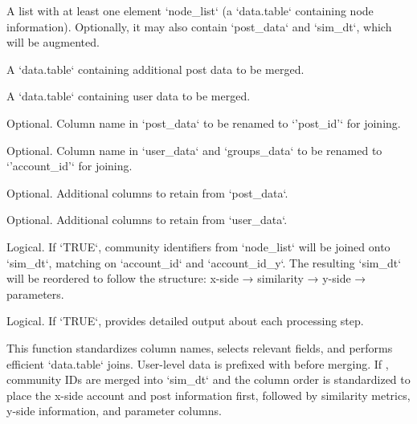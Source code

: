 \documentclass[a4paper]{book}
\begin{document}
%
\begin{Arguments}
\begin{ldescription}
\item[\code{groups\_data}] A list with at least one element `node\_list` (a `data.table` containing node information).
Optionally, it may also contain `post\_data` and `sim\_dt`, which will be augmented.

\item[\code{post\_data}] A `data.table` containing additional post data to be merged.

\item[\code{user\_data}] A `data.table` containing user data to be merged.

\item[\code{post\_id}] Optional. Column name in `post\_data` to be renamed to `'post\_id'` for joining.

\item[\code{account\_id}] Optional. Column name in `user\_data` and `groups\_data` to be renamed to `'account\_id'` for joining.

\item[\code{other\_post\_vars}] Optional. Additional columns to retain from `post\_data`.

\item[\code{other\_user\_vars}] Optional. Additional columns to retain from `user\_data`.

\item[\code{sim\_dt\_community}] Logical. If `TRUE`, community identifiers from `node\_list` will be joined onto `sim\_dt`,
matching on `account\_id` and `account\_id\_y`. The resulting `sim\_dt` will be reordered
to follow the structure: x-side → similarity → y-side → parameters.

\item[\code{verbose}] Logical. If `TRUE`, provides detailed output about each processing step.
\end{ldescription}
\end{Arguments}
%
\begin{Details}
This function standardizes column names, selects relevant fields, and performs efficient `data.table` joins.
User-level data is prefixed with  before merging. If , community IDs
are merged into `sim\_dt` and the column order is standardized to place the x-side account and post information first,
followed by similarity metrics, y-side information, and parameter columns.
\end{Details}
\end{document}
